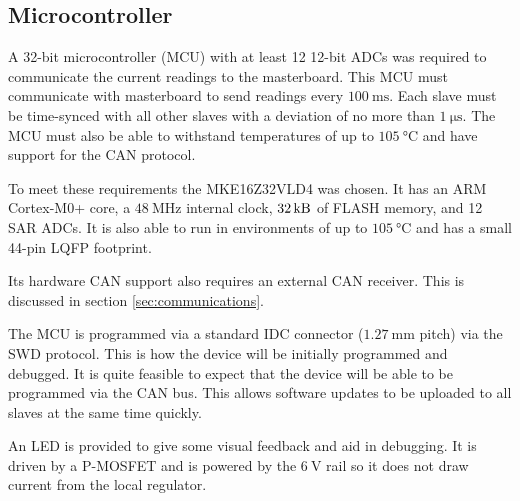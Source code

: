 \subsection{Microcontroller}
\label{sec:microcontroller}

A 32-bit microcontroller (MCU) with at least 12 12-bit ADCs was required to communicate the current readings to the masterboard.
This MCU must communicate with masterboard to send readings every $\SI{100}{\milli\second}$.
Each slave must be time-synced with all other slaves with a deviation of no more than $\SI{1}{\micro\second}$.
The MCU must also be able to withstand temperatures of up to $\SI{105}{\degreeCelsius}$ and have support for the CAN protocol.

To meet these requirements the MKE16Z32VLD4 was chosen.
It has an ARM Cortex-M0+ core, a $\SI{48}{\mega\hertz}$ internal clock, $\SI{32}{\kilo\byte}$ of FLASH memory, and 12 SAR ADCs.
It is also able to run in environments of up to $\SI{105}{\degreeCelsius}$ and has a small 44-pin LQFP footprint.

Its hardware CAN support also requires an external CAN receiver.
This is discussed in section \ref{sec:communications}.

The MCU is programmed via a standard IDC connector ($\SI{1.27}{\milli\metre}$ pitch) via the SWD protocol.
This is how the device will be initially programmed and debugged.
It is quite feasible to expect that the device will be able to be programmed via the CAN bus.
This allows software updates to be uploaded to all slaves at the same time quickly.

An LED is provided to give some visual feedback and aid in debugging.
It is driven by a P-MOSFET and is powered by the $\SI{6}{\volt}$ rail so it does not draw current from the local regulator.

